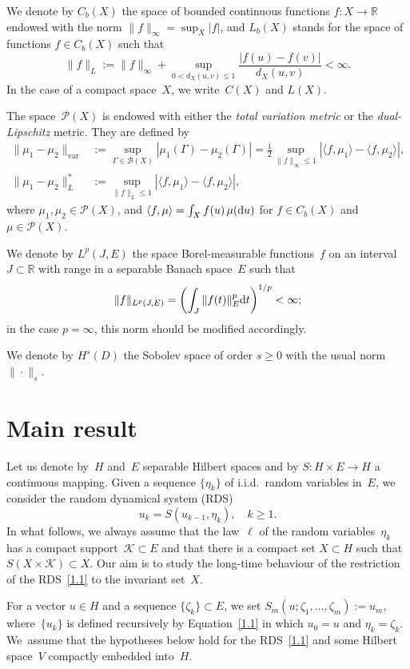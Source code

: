 \documentclass[JEP,XML,SOM,Unicode,ThmDefs]{cedram}
\let\mathcal\mathscr
\theoremstyle{plain}
\numberwithin{equation}{section}
\let\lag\langle
\let\rag\rangle
\newcommand{\dd}{{\textup d}}
\newcommand{\R}{{\mathbb R}}
\newcommand{\BB}{{\mathcal B}}
\newcommand{\KK}{{\mathcal K}}
\newcommand{\PP}{{\mathcal P}}
\begin{document}
We denote by $C_b(X)$ the space of bounded continuous functions $f:X\to\R$ endowed with the norm $\|f\|_\infty=\sup_X|f|$, and $L_b(X)$ stands for the space of functions $f\in C_b(X)$ such that
\[
\|f\|_L:=\|f\|_\infty+\sup_{0<d_X(u,v)\le 1}\frac{|f(u)-f(v)|}{d_X(u,v)}<\infty.
\]
In the case of a compact space~$X$, we write~$C(X)$ and $L(X)$.

The space~$\PP(X)$ is endowed with either the \emph{total variation metric} or the \emph{dual-Lipschitz} metric. They are defined by
\begin{align}
\|\mu_1-\mu_2\|_{\mathrm{var}}&:=\sup_{\Gamma\in\BB(X)}|\mu_1(\Gamma)-\mu_2(\Gamma)|
=\frac12\sup_{\|f\|_\infty\le1}
\left|\lag f,\mu_1\rag-\lag f,\mu_2\rag\right|, \label{TVN}\\
\|\mu_1-\mu_2\|_L^*
&:=\sup_{\|f\|_L\le1}\left|\lag f,\mu_1\rag-\lag f,\mu_2\rag\right|, \label{dL}
\end{align}
where $\mu_1, \mu_2\in \PP(X)$, and $\lag f,\mu\rag = \int_X f(u) \,\mu(\dd u)$ for $f\in C_b(X)$ and $\mu\in \PP(X)$.

We denote by $L^p(J,E)$ the space Borel-measurable functions~$f$ on an interval $J\subset\R$ with range in a separable Banach space~$E$ such that
\[
\|f\|_{L^p(J,E)}=\biggl(\int_J \|f(t)\|_E^p\dd t\biggr)^{1/p}<\infty;
\]
in the case $p=\infty$, this norm should be modified accordingly.

We denote by $H^s(D)$ the Sobolev space of order $s\ge0$ with the usual norm~$\|\cdot\|_s$.

\section{Main result}
\label{s1}

Let us denote by~$H$ and~$E$ separable Hilbert spaces and by $S:H\times E\to H$ a continuous mapping. Given a sequence $\{\eta_k\}$ of i.i.d.\ random variables in~$E$, we consider the random dynamical system (RDS)
\begin{equation} \label{1.1}
u_k=S(u_{k-1},\eta_k), \quad k\ge1.
\end{equation}
In what follows, we always assume that the law~$\ell$ of the random variables~$\eta_k$ has a compact support~$\KK\subset E$ and that there is a compact set $X\subset H$ such that $S(X\times\KK)\subset X$. Our aim is to study the long-time behaviour of the restriction of the RDS~\eqref{1.1} to the invariant set~$X$.

For a vector $u\in H$ and a sequence $\{\zeta_k\}\subset E$, we set $S_m(u;\zeta_1,\dots,\zeta_m):=u_m$, where~$\{u_k\}$ is defined recursively by Equation~\eqref{1.1} in which $u_0=u$ and $\eta_k=\zeta_k$. We~assume that the hypotheses below hold for the RDS~\eqref{1.1} and some Hilbert space~$V$ compactly embedded into~$H$.
\end{document}
